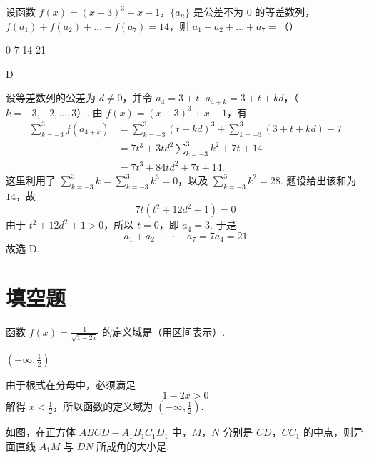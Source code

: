 \begin{problem}
设函数 \( f(x) = (x - 3)^3 + x - 1 \)，\( \{a_n\} \) 是公差不为 0 的等差数列，\( f(a_1) + f(a_2) + \dots + f(a_7) = 14 \)，则 \( a_1 + a_2 + \dots + a_7 = \)（\quad）

\choices
    {0}
    {7}
    {14}
    {21}
\end{problem}

\begin{answer}
D
\end{answer}

\begin{solution}
设等差数列的公差为 \(d\ne0\)，并令 \(a_4=3+t\).
\(a_{4+k}=3+t+kd\)，（\(k=-3,-2,\ldots,3\)）.
由 \(f(x)=(x-3)^3+x-1\)，有
\[
\begin{aligned}
\sum_{k=-3}^{3}f(a_{4+k})
&=\sum_{k=-3}^{3}(t+kd)^3+\sum_{k=-3}^{3}(3+t+kd)-7\\
&=7t^3+3td^2\sum_{k=-3}^{3}k^2+7t+14\\
&=7t^3+84td^2+7t+14.
\end{aligned}
\]
这里利用了 \(\sum_{k=-3}^{3}k=\sum_{k=-3}^{3}k^3=0\)，以及
\(\sum_{k=-3}^{3}k^2=28\).
题设给出该和为 \(14\)，故
\[
7t(t^2+12d^2+1)=0
\]
由于 \(t^2+12d^2+1>0\)，所以 \(t=0\)，即 \(a_4=3\). 于是
\[
a_1+a_2+\cdots+a_7=7a_4=21
\]
故选 D.
\end{solution}

\section{填空题}

\begin{problem}
函数 \( f(x) = \frac{1}{\sqrt{1 - 2x}} \) 的定义域是\fillinblank{}（用区间表示）.
\end{problem}

\begin{answer}
\(\left(-\infty, \frac{1}{2}\right)\)
\end{answer}

\begin{solution}
由于根式在分母中，必须满足
\[
1-2x>0
\]
解得 \(x<\frac12\)，所以函数的定义域为 \(\left(-\infty,\frac12\right)\).
\end{solution}

\begin{problem}
如图，在正方体 \(ABCD - A_{1}B_{1}C_{1}D_{1}\) 中，\(M\)，\(N\) 分别是 \(CD\)，\(CC_{1}\) 的中点，则异面直线 \(A_{1}M\) 与 \(DN\) 所成角的大小是\fillinblank{}.
\end{problem}

